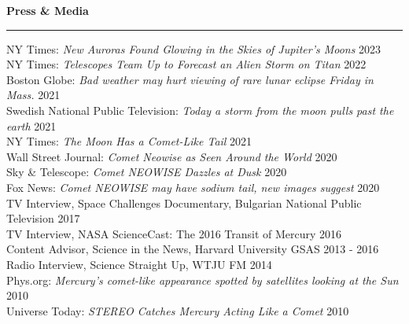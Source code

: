 \documentclass[12pt]{report}
\begin{document}
\noindent\bf{Press \& Media}\rm \hspace*{\fill} \\
\rule{\textwidth}{1pt}
\noindent NY Times: {\it New Auroras Found Glowing in the Skies of Jupiter’s Moons} \hfill 2023\\
\noindent NY Times: {\it Telescopes Team Up to Forecast an Alien Storm on Titan} \hfill 2022\\
\noindent Boston Globe: {\it Bad weather may hurt viewing of rare lunar eclipse Friday in Mass.} \hfill 2021\\
\noindent Swedish National Public Television: {\it Today a storm from the moon pulls past the earth} \hfill 2021\\
\noindent NY Times: {\it The Moon Has a Comet-Like Tail} \hfill 2021\\
\noindent Wall Street Journal: {\it Comet Neowise as Seen Around the World} \hfill 2020\\
\noindent Sky \& Telescope: {\it Comet NEOWISE Dazzles at Dusk} \hfill 2020\\
\noindent Fox News: {\it Comet NEOWISE may have sodium tail, new images suggest} \hfill 2020\\
\noindent TV Interview, Space Challenges Documentary, Bulgarian National Public Television \hfill 2017\\
\noindent TV Interview, NASA ScienceCast: The 2016 Transit of Mercury \hfill 2016\\
\noindent Content Advisor, Science in the News, Harvard University GSAS \hfill 2013 - 2016\\
\noindent Radio Interview, Science Straight Up, WTJU FM \hfill 2014\\
\noindent Phys.org: {\it Mercury's comet-like appearance spotted by satellites looking at the Sun} \hfill 2010\\
\noindent Universe Today: {\it STEREO Catches Mercury Acting Like a Comet} \hfill 2010\\
\end{document}
